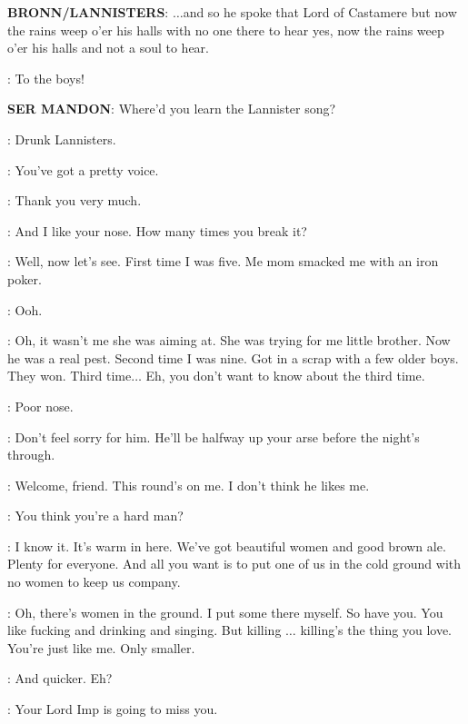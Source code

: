 \textbf{BRONN/LANNISTERS}:  $\ldots$and so he spoke that Lord of Castamere but now the rains weep o'er his halls  with no one there to hear yes, now the rains weep o'er his halls and not a soul to hear. 

\BRONN:  To the boys! 


\textbf{SER MANDON}: Where'd you learn the Lannister song? 

\BRONN: Drunk Lannisters. 


\WHORE: You've got a pretty voice. 

\BRONN: Thank you very much. 

\WHORE: And I like your nose. How many times you break it? 

\BRONN: Well, now let's see. First time I was five. Me mom smacked me with an iron poker. 

\WHORE: Ooh. 

\BRONN: Oh, it wasn't me she was aiming at. She was trying for me
little brother. Now he was a real pest. Second time I was nine. Got in
a scrap with a few older boys. They won. Third time$\ldots$  Eh, you don't want to know about the third time. 

\WHORE: Poor nose. 

\BRONN: Don't feel sorry for him. He'll be halfway up your arse before the night's through. 


\BRONN: Welcome, friend. This round's on me.  I don't think he likes me. 

\HOUND: You think you're a hard man? 

\BRONN: I know it. It's warm in here. We've got beautiful women and good brown ale. Plenty for everyone. And all you want is to put one of us in the cold ground with no women to keep us company. 

\HOUND: Oh, there's women in the ground. I put some there myself. So have you. You like fucking and drinking and singing. But killing $\ldots$ killing's the thing you love. You're just like me. Only smaller. 

\BRONN: And quicker. Eh? 

\HOUND: Your Lord Imp is going to miss you. 


